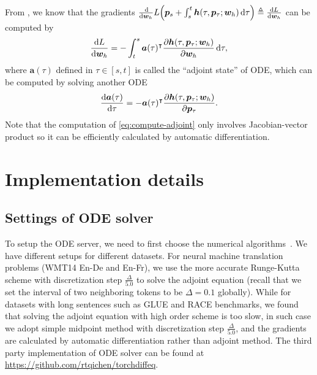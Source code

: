\documentclass[11pt]{article}
\def\va{{\bm{a}}}
\def\vh{{\bm{h}}}
\def\vp{{\bm{p}}}
\def\vw{{\bm{w}}}
\begin{document}
From \cite{chen2018neural}, we know that the gradients $\frac{\dif}{\dif \vw_h}L\Big(\vp_s+\int_s^t\vh(\tau,\vp_{\tau};\vw_h)\dif \tau\Big)\triangleq \frac{\dif L}{\dif \vw_h}$ can be computed by
\begin{equation}
    \label{eq:compute-grad}
    \frac{\dif L}{\dif \vw_h}=-\int_t^s\va(\tau)^\intercal \frac{\partial \vh(\tau,\vp_{\tau};\vw_h)}{\partial \vw_h}\dif\tau,
\end{equation}
where $\va(\tau)$ defined in $\tau\in[s,t]$ is called the ``adjoint state'' of ODE, which can be computed by solving another ODE
\begin{equation}
\label{eq:compute-adjoint}
    \frac{\dif \va(\tau)}{\dif \tau}=-\va(\tau)^\intercal \frac{\partial \vh(\tau,\vp_{\tau};\vw_h)}{\partial \vp_{\tau}}.
\end{equation}
Note that the computation of \eqref{eq:compute-adjoint} only involves Jacobian-vector product so it can be efficiently calculated by automatic differentiation.

\section{Implementation details}
\subsection{Settings of ODE solver}
To setup the ODE server, we need to first choose the numerical algorithms~\cite{press1992numerical}. We have different setups for different datasets. For neural machine translation problems (WMT14 En-De and En-Fr), we use the more accurate Runge-Kutta scheme with discretization  step $\frac{\Delta}{5.0}$ to solve the adjoint equation (recall that we set the interval of two neighboring tokens to be $\Delta=0.1$ globally). While for datasets with long sentences such as GLUE and RACE benchmarks, we found that solving the adjoint equation with high order scheme is too slow, in such case we adopt simple midpoint method with discretization  step $\frac{\Delta}{5.0}$, and the gradients are calculated by automatic differentiation rather than adjoint method. The third party implementation of ODE solver can be found at \url{https://github.com/rtqichen/torchdiffeq}.
\end{document}
